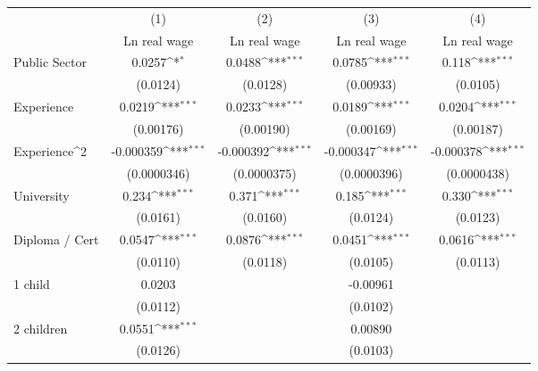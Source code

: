 {
\def\sym#1{\ifmmode^{#1}\else\(^{#1}\)\fi}
\begin{tabular}{l*{4}{c}}
\hline\hline
                    &\multicolumn{1}{c}{(1)}&\multicolumn{1}{c}{(2)}&\multicolumn{1}{c}{(3)}&\multicolumn{1}{c}{(4)}\\
                    &\multicolumn{1}{c}{Ln real wage}&\multicolumn{1}{c}{Ln real wage}&\multicolumn{1}{c}{Ln real wage}&\multicolumn{1}{c}{Ln real wage}\\
\hline
Public Sector       &      0.0257\sym{*}  &      0.0488\sym{***}&      0.0785\sym{***}&       0.118\sym{***}\\
                    &    (0.0124)         &    (0.0128)         &   (0.00933)         &    (0.0105)         \\
[1em]
Experience          &      0.0219\sym{***}&      0.0233\sym{***}&      0.0189\sym{***}&      0.0204\sym{***}\\
                    &   (0.00176)         &   (0.00190)         &   (0.00169)         &   (0.00187)         \\
[1em]
Experience^{2}      &   -0.000359\sym{***}&   -0.000392\sym{***}&   -0.000347\sym{***}&   -0.000378\sym{***}\\
                    & (0.0000346)         & (0.0000375)         & (0.0000396)         & (0.0000438)         \\
[1em]
University          &       0.234\sym{***}&       0.371\sym{***}&       0.185\sym{***}&       0.330\sym{***}\\
                    &    (0.0161)         &    (0.0160)         &    (0.0124)         &    (0.0123)         \\
[1em]
Diploma / Cert      &      0.0547\sym{***}&      0.0876\sym{***}&      0.0451\sym{***}&      0.0616\sym{***}\\
                    &    (0.0110)         &    (0.0118)         &    (0.0105)         &    (0.0113)         \\
[1em]
1 child             &      0.0203         &                     &    -0.00961         &                     \\
                    &    (0.0112)         &                     &    (0.0102)         &                     \\
[1em]
2 children          &      0.0551\sym{***}&                     &     0.00890         &                     \\
                    &    (0.0126)         &                     &    (0.0103)         &                     \\

\end{tabular}}
